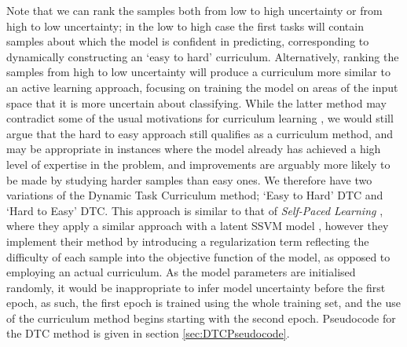 Note that we can rank the samples both from low to high uncertainty or from high to low uncertainty; in the low to high case the first tasks will contain samples about which the model is confident in predicting, corresponding to dynamically constructing an `easy to hard' curriculum. Alternatively, ranking the samples from high to low uncertainty will produce a curriculum more similar to an active learning approach, focusing on training the model on areas of the input space that it is more uncertain about classifying. While the latter method may contradict some of the usual motivations for curriculum learning \cite{Bengio2009}, we would still argue that the hard to easy approach still qualifies as a curriculum method, and may be appropriate in instances where the model already has achieved a high level of expertise in the problem, and improvements are arguably more likely to be made by studying harder samples than easy ones.  We therefore have two variations of the Dynamic Task Curriculum method; `Easy to Hard' DTC and `Hard to Easy' DTC. This approach is similar to that of \textit{Self-Paced Learning} \cite{kumar2010self}, where they apply a similar approach with a latent SSVM model \cite{felzenszwalb2008discriminatively}, however they implement their method by introducing a regularization term reflecting the difficulty of each sample into the objective function of the model, as opposed to employing an actual curriculum. As the model parameters are initialised randomly, it would be inappropriate to infer model uncertainty before the first epoch, as such, the first epoch is trained using the whole training set, and the use of the curriculum method begins starting with the second epoch.  Pseudocode for the DTC method is given in section \ref{sec:DTCPseudocode}.

